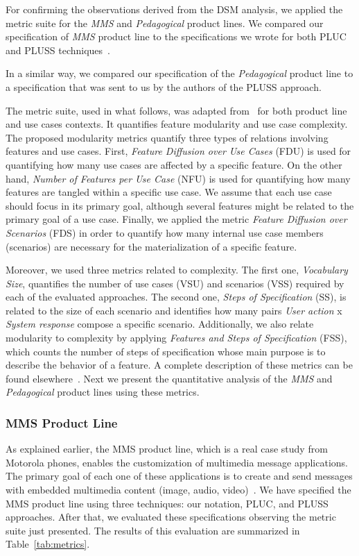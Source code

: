 \documentclass{acm_proc_article-sp}
\begin{document}
For confirming the observations derived from the DSM analysis, we applied the
metric suite for the \emph{MMS} and \emph{Pedagogical} product lines. We compared
our specification of \emph{MMS} product line to the specifications we wrote for
both PLUC and PLUSS techniques~\cite{spg-url}.

In a similar way, we compared our specification of the \emph{Pedagogical} product line 
to a specification that was sent to us by the authors of the PLUSS approach. 

The metric suite, used in what follows, was adapted from~\cite{garcia-taosd-2005} for both product line 
and use cases contexts. It quantifies 
feature modularity and use case complexity. The proposed modularity 
metrics quantify three types of relations involving features and use cases.
First, \emph{Feature Diffusion over Use Cases} (FDU) is used for
quantifying how many use cases are affected by a specific
feature. On the other hand, \emph{Number of Features per Use Case} (NFU) is used for quantifying
how many features are tangled within a specific use
case. We assume that each use case should focus in
its primary goal, although several features might be related
to the primary goal of a use case. Finally, we applied
the metric \emph{Feature Diffusion over Scenarios} (FDS) in order
to quantify how many internal use case members (scenarios)
are necessary for the materialization of a specific feature.
 
Moreover, we used three metrics related to complexity.
The first one, \emph{Vocabulary Size}, quantifies the number of use
cases (VSU) and scenarios (VSS) required by each of the evaluated
approaches. The second one, \emph{Steps of Specification}
(SS), is related to the size of each scenario and identifies
how many pairs \emph{User action} x \emph{System response} compose a
specific scenario. Additionally, we also relate modularity to
complexity by applying \emph{Features and Steps of Specification}
(FSS), which counts the number of steps of specification
whose main purpose is to describe the behavior of a feature. 
A complete description of these metrics can be found elsewhere~\cite{rbonifacio-ea-2008}. Next we 
present the quantitative analysis of the \emph{MMS} and \emph{Pedagogical} product lines using these metrics.

\subsubsection{MMS Product Line}

As explained earlier, the MMS product line, which is a real case study from Motorola phones, enables the customization of 
multimedia message applications. The primary goal of each one of these applications is to create and 
send messages with embedded multimedia content (image, audio, video)~\cite{rbonifacio-ea-2008}. 
We have specified the MMS product line using three techniques: our notation, PLUC, and PLUSS approaches. After that, we evaluated these specifications observing the metric suite just presented. The results of this evaluation are summarized in Table~\ref{tab:metrics}. 
\end{document}
